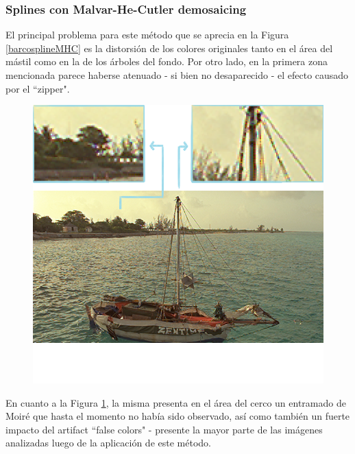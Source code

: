 \documentclass[a4paper]{article}
\begin{document}
\subsubsection{Splines con Malvar-He-Cutler demosaicing}

El principal problema para este método que se aprecia en la Figura \ref{barcosplineMHC} es la distorsión de los colores originales tanto en el área del mástil como en la de los árboles del fondo. Por otro lado, en la primera zona mencionada parece haberse atenuado - si bien no desaparecido - el efecto causado por el ``zipper".

\begin{figure}[h!]
	\caption{}
	\begin{center}
	\includegraphics[scale=0.06]{imagenes/barcosplineMHC}
	\label{cercosplineMHC}
  \end{center}
\end{figure}


En cuanto a la Figura \ref{cercosplineMHC}, la misma presenta en el área del cerco un entramado de Moiré que hasta el momento no había sido observado, así como también un fuerte impacto del artifact ``false colors" - presente la mayor parte de las imágenes analizadas luego de la aplicación de este método.
\end{document}
